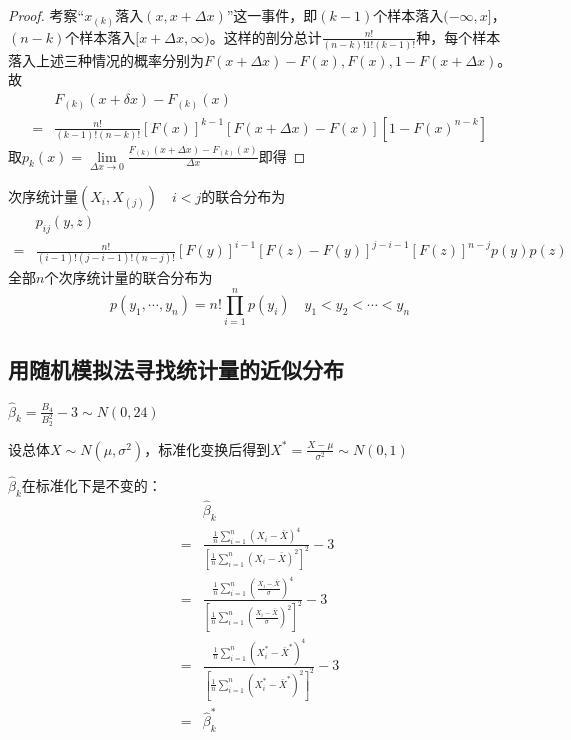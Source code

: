 \documentclass[UTF-8]{ctexbeamer}
\begin{document}
\begin{frame}
  \begin{proof}
    考察“$x_{(k)}$落入$(x,x+\Delta x)$”这一事件，即$(k-1)$个样本落入$(-\infty,x]$，$(n-k)$个样本落入$[x+\Delta x,\infty)$。这样的剖分总计$\frac{n!}{(n-k)!1!(k-1)!}$种，每个样本落入上述三种情况的概率分别为$F(x+\Delta x)-F(x),F(x),1-F(x+\Delta x)$。故
    \begin{align*}
    &F_{(k)}(x+\delta x)-F_{(k)}(x)\\
      =&\frac{n!}{(k-1)!(n-k)!}[F(x)]^{k-1}[F(x+\Delta x)-F(x)][1-F(x)^{n-k}]
      \end{align*}
    取$p_{k}(x)=\lim\limits_{\Delta x\to 0} \frac{F_{(k)}(x+\Delta x)-F_{(k)}(x)}{\Delta x}$即得
  \end{proof}
\end{frame}

\begin{frame}
  \begin{Cor}
    次序统计量$(X_{{i}},X_{(j)})\quad i<j$的联合分布为
    \begin{align*}
      &p_{ij}(y,z)\\
      =&\frac{n!}{(i-1)!(j-i-1)!(n-j)!}[F(y)]^{i-1}[F(z)-F(y)]^{j-i-1}[F(z)]^{n-j}p(y)p(z)
      \end{align*}
    全部$n$个次序统计量的联合分布为
    \[p(y_{1},\cdots,y_{n})=n!\prod_{i=1}^{n}p(y_{i})\quad y_{1}<y_{2}<\cdots<y_{n}\]
  \end{Cor}
\end{frame}

\subsection{用随机模拟法寻找统计量的近似分布}

\begin{frame}
  $\hat \beta_{k}=\frac{B_{4}}{B_{2}^{2}}-3\sim N(0,24)$

  设总体$X\sim N(\mu,\sigma^{2})$，标准化变换后得到$X^{*}=\frac{X-\mu}{\sigma^{2}}\sim N(0,1)$
  
  $\hat \beta_{k}$在标准化下是不变的：
  \begin{align*}
    &\hat\beta_{k}\\
    =&\frac{\frac{1}{n}\sum_{i=1}^{n}(X_{i}-\bar X)^{4}}{[\frac{1}{n}\sum_{i=1}^{n}(X_{i}-\bar X)^{2}]^{2}}-3\\
    =&\frac{\frac{1}{n}\sum_{i=1}^{n}(\frac{X_{i}-\bar X}{\sigma})^{4}}{[\frac{1}{n}\sum_{i=1}^{n}(\frac{X_{i}-\bar X}{\sigma})^{2}]^{2}}-3\\
    =&\frac{\frac{1}{n}\sum_{i=1}^{n}(X^{*}_{i}-\bar X^{*})^{4}}{[\frac{1}{n}\sum_{i=1}^{n}(X^{*}_{i}-\bar X^{*})^{2}]^{2}}-3\\
    =&\hat \beta_{k}^{*}
    \end{align*}
\end{frame}
\end{document}
